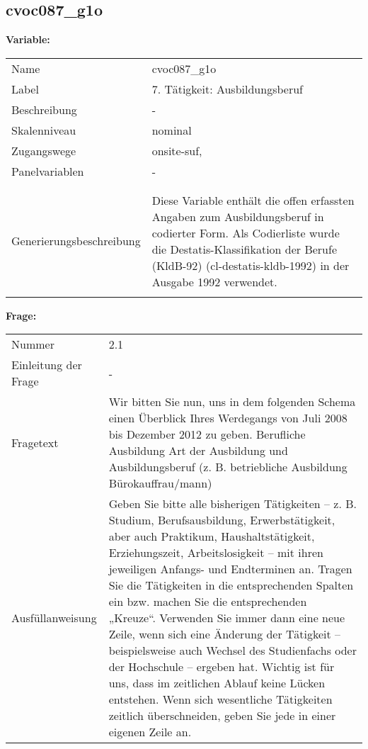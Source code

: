 	
	
	\subsection{cvoc087\_g1o}
	\label{subSection:cvoc087_g1o}

	\noindent\textbf{Variable:}\\
		\begin{tabular}{lL{11.3cm}}
			\label{tableVariable:cvoc087_g1o}
			Name & cvoc087\_g1o \\
			Label & 7. Tätigkeit: Ausbildungsberuf \\
			Beschreibung & - \\
			Skalenniveau & nominal \\
			Zugangswege &
				onsite-suf,
 \\
			Panelvariablen & -
			 \\
			 \\
 \\
					Generierungsbeschreibung & Diese Variable enthält die offen erfassten Angaben zum Ausbildungsberuf in codierter Form. Als Codierliste wurde die Destatis-Klassifikation der Berufe (KldB-92) (cl-destatis-kldb-1992) in der Ausgabe 1992 verwendet. 
				 \\	
			 \\
		\end{tabular}

		\vspace*{1 cm}
		\noindent\textbf{Frage:}\\
		\begin{tabular}{lL{11.3cm}}
			\label{tableQuestion:cvoc087_g1o}
			Nummer & 2.1 \\
			Einleitung der Frage & - \\
			Fragetext & Wir bitten Sie nun, uns in dem folgenden Schema einen Überblick Ihres Werdegangs von Juli 2008 bis Dezember 2012 zu geben.
Berufliche Ausbildung
Art der Ausbildung und Ausbildungsberuf
(z. B. betriebliche Ausbildung Bürokauffrau/mann) \\
			Ausfüllanweisung & Geben Sie bitte alle bisherigen Tätigkeiten – z. B. Studium, Berufsausbildung, Erwerbstätigkeit, aber auch Praktikum, Haushaltstätigkeit,
Erziehungszeit, Arbeitslosigkeit – mit ihren jeweiligen Anfangs- und Endterminen an. Tragen Sie die Tätigkeiten in die entsprechenden Spalten ein bzw. machen Sie die entsprechenden „Kreuze“. Verwenden Sie immer dann eine neue Zeile, wenn sich eine Änderung der Tätigkeit – beispielsweise auch Wechsel des Studienfachs oder der Hochschule – ergeben hat. Wichtig ist für uns, dass im zeitlichen Ablauf keine Lücken entstehen. Wenn sich wesentliche Tätigkeiten zeitlich überschneiden, geben Sie jede in einer eigenen Zeile an. \\
		\end{tabular}





